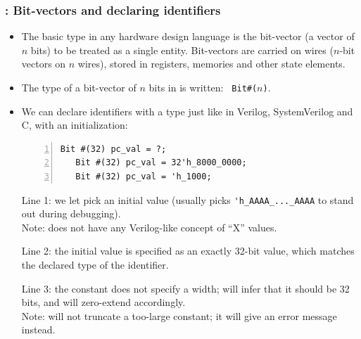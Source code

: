 \begin{frame}[fragile]
\frametitle{{\BSV}: Bit-vectors and declaring identifiers}

\footnotesize

\begin{itemize}

 \item The basic type in any hardware design language is the
       bit-vector (a vector of $n$ bits) to be treated as a single
       entity.  Bit-vectors are carried on wires ($n$-bit vectors on
       $n$ wires), stored in registers, memories and other state
       elements.

 \vspace{1ex}

 \item The type of a bit-vector of $n$ bits in {\BSV} is written: {\tt
       Bit\#($n$)}.

 \vspace{1ex}

 \item We can declare identifiers with a type just like in Verilog,
       SystemVerilog and C, with an initialization:

 \vspace{1ex}

 \begin{Verbatim}[frame=single, numbers=left]
   Bit #(32) pc_val = ?;
   Bit #(32) pc_val = 32'h_8000_0000;
   Bit #(32) pc_val = 'h_1000;
 \end{Verbatim}

 \vspace{1ex}

 Line 1: we let {\bsc} pick an initial value (usually picks
 \verb|'h_AAAA_..._AAAA| to stand out during debugging). \\
 \hmmmm Note: {\BSV} does not have any Verilog-like concept of ``X'' values.

 \vspace{1ex}

 Line 2: the initial value is specified as an exactly 32-bit value,
 which matches the declared type of the identifier.

 \vspace{1ex}

 Line 3: the constant does not specify a width; {\bsc} will infer that
 it should be 32 bits, and will zero-extend accordingly. \\
 Note: {\bsc} will not truncate a too-large constant; it will give an
 error message instead.

\end{itemize}

\end{frame}

